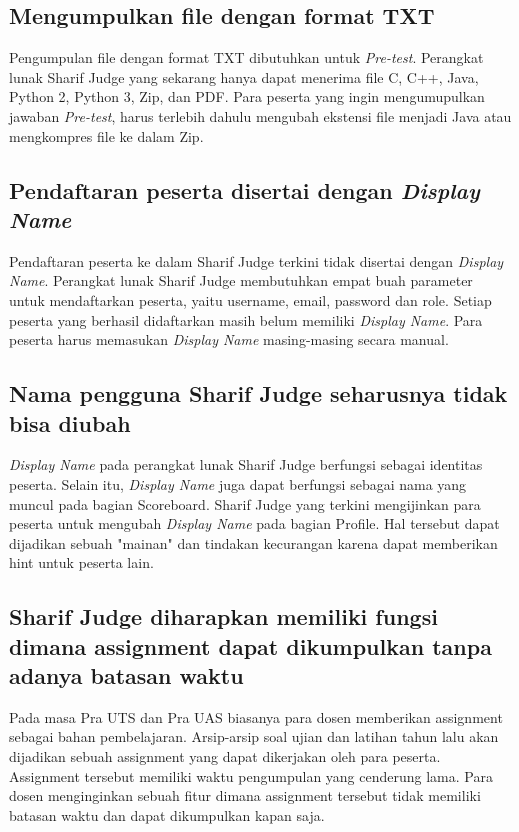 \subsection{Mengumpulkan file dengan format TXT}
Pengumpulan file dengan format TXT dibutuhkan untuk \textit{Pre-test}. Perangkat lunak Sharif Judge yang sekarang hanya dapat menerima file C, C++, Java, Python 2, Python 3, Zip, dan PDF. Para peserta yang ingin mengumupulkan jawaban \textit{Pre-test}, harus terlebih dahulu mengubah ekstensi file menjadi Java atau mengkompres file ke dalam Zip.

\subsection{Pendaftaran peserta disertai dengan \textit{Display Name}}
Pendaftaran peserta ke dalam Sharif Judge terkini tidak disertai dengan \textit{Display Name}. Perangkat lunak Sharif Judge membutuhkan empat buah parameter untuk mendaftarkan peserta, yaitu username, email, password dan role. Setiap peserta yang berhasil didaftarkan masih belum memiliki \textit{Display Name}. Para peserta harus memasukan \textit{Display Name} masing-masing secara manual.

\subsection{Nama pengguna Sharif Judge seharusnya tidak bisa diubah}
\textit{Display Name} pada perangkat lunak Sharif Judge berfungsi sebagai identitas peserta. Selain itu, \textit{Display Name} juga dapat berfungsi sebagai nama yang muncul pada bagian Scoreboard. Sharif Judge yang terkini mengijinkan para peserta untuk mengubah \textit{Display Name} pada bagian Profile. Hal tersebut dapat dijadikan sebuah "mainan" dan tindakan kecurangan karena dapat memberikan hint untuk peserta lain.

\subsection{Sharif Judge diharapkan memiliki fungsi dimana assignment dapat dikumpulkan tanpa adanya batasan waktu}
Pada masa Pra UTS dan Pra UAS biasanya para dosen memberikan assignment sebagai bahan pembelajaran. Arsip-arsip soal ujian dan latihan tahun lalu akan dijadikan sebuah assignment yang dapat dikerjakan oleh para peserta. Assignment tersebut memiliki waktu pengumpulan yang cenderung lama. Para dosen menginginkan sebuah fitur dimana assignment tersebut tidak memiliki batasan waktu dan dapat dikumpulkan kapan saja.

